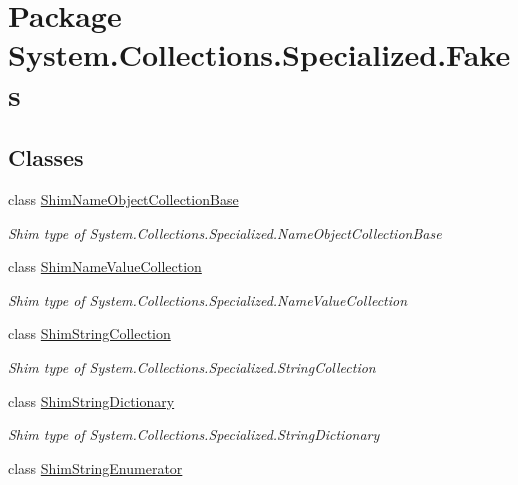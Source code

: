 \hypertarget{namespace_system_1_1_collections_1_1_specialized_1_1_fakes}{\section{Package System.\-Collections.\-Specialized.\-Fakes}
\label{namespace_system_1_1_collections_1_1_specialized_1_1_fakes}
}
\subsection*{Classes}
\begin{DoxyCompactItemize}
\item 
class \hyperlink{class_system_1_1_collections_1_1_specialized_1_1_fakes_1_1_shim_name_object_collection_base}{Shim\-Name\-Object\-Collection\-Base}
\begin{DoxyCompactList}\small\item\em Shim type of System.\-Collections.\-Specialized.\-Name\-Object\-Collection\-Base\end{DoxyCompactList}\item 
class \hyperlink{class_system_1_1_collections_1_1_specialized_1_1_fakes_1_1_shim_name_value_collection}{Shim\-Name\-Value\-Collection}
\begin{DoxyCompactList}\small\item\em Shim type of System.\-Collections.\-Specialized.\-Name\-Value\-Collection\end{DoxyCompactList}\item 
class \hyperlink{class_system_1_1_collections_1_1_specialized_1_1_fakes_1_1_shim_string_collection}{Shim\-String\-Collection}
\begin{DoxyCompactList}\small\item\em Shim type of System.\-Collections.\-Specialized.\-String\-Collection\end{DoxyCompactList}\item 
class \hyperlink{class_system_1_1_collections_1_1_specialized_1_1_fakes_1_1_shim_string_dictionary}{Shim\-String\-Dictionary}
\begin{DoxyCompactList}\small\item\em Shim type of System.\-Collections.\-Specialized.\-String\-Dictionary\end{DoxyCompactList}\item 
class \hyperlink{class_system_1_1_collections_1_1_specialized_1_1_fakes_1_1_shim_string_enumerator}{Shim\-String\-Enumerator}

\end{DoxyCompactItemize}
